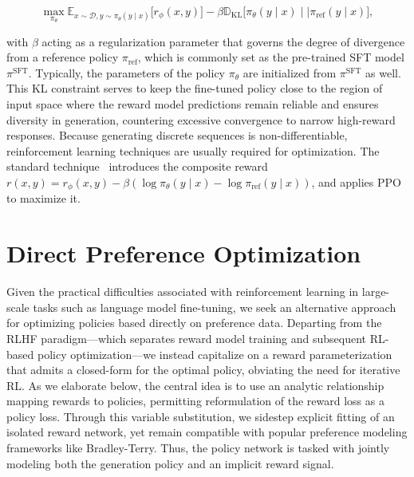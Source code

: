 \begin{equation}\label{eq:RL}
\max_{\pi_{\theta}}  \mathbb{E}_{x\sim \mathcal{D}, y\sim \pi_{\theta}(y \mid x)}\bigl[r_{\phi}(x, y)\bigr] - \beta\mathbb{D}_{\textrm{KL}}\bigl[\pi_{\theta}(y\mid x)\mid \mid \pi_\text{ref}(y\mid x)\bigr],
\end{equation}

with $\beta$ acting as a regularization parameter that governs the degree of divergence from a reference policy $\pi_\text{ref}$, which is commonly set as the pre-trained SFT model $\pi^\text{SFT}$. 
Typically, the parameters of the policy $\pi_\theta$ are initialized from $\pi^\text{SFT}$ as well. This KL constraint serves to keep the fine-tuned policy close to the region of input space where the reward model predictions remain reliable and ensures diversity in generation, countering excessive convergence to narrow high-reward responses. Because generating discrete sequences is non-differentiable, reinforcement learning techniques are usually required for optimization. The standard technique~\cite{ziegler2020finetuning, stiennon2022learning, bai2022training, ouyang2022training} introduces the composite reward ${r(x, y) = r_{\phi}(x, y) -\beta (\log \pi_{\theta}(y\mid x) - \log \pi_\text{ref}(y\mid x))}$, and applies PPO~\cite{schulman2017proximal} to maximize it.

\section{Direct Preference Optimization}\label{sec:DPO}

Given the practical difficulties associated with reinforcement learning in large-scale tasks such as language model fine-tuning, we seek an alternative approach for optimizing policies based directly on preference data. Departing from the RLHF paradigm—which separates reward model training and subsequent RL-based policy optimization—we instead capitalize on a reward parameterization that admits a closed-form for the optimal policy, obviating the need for iterative RL. As we elaborate below, the central idea is to use an analytic relationship mapping rewards to policies, permitting reformulation of the reward loss as a policy loss. Through this variable substitution, we sidestep explicit fitting of an isolated reward network, yet remain compatible with popular preference modeling frameworks like Bradley-Terry. Thus, the policy network is tasked with jointly modeling both the generation policy and an implicit reward signal.

